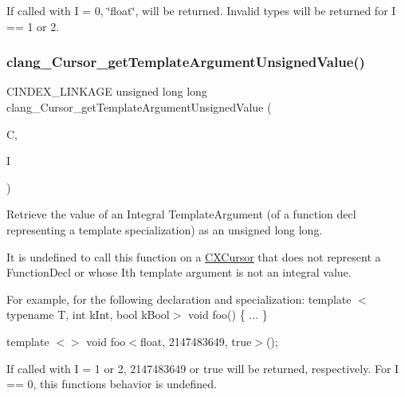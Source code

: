 If called with I = 0, \char`\"{}float\char`\"{}, will be returned. Invalid types will be returned for I == 1 or 2. \mbox{\label{group__CINDEX__TYPES_ga08dac49044448c022457224e73223eb2}} 
\subsubsection{\texorpdfstring{clang\+\_\+\+Cursor\+\_\+get\+Template\+Argument\+Unsigned\+Value()}{clang\_Cursor\_getTemplateArgumentUnsignedValue()}}
{\footnotesize\ttfamily C\+I\+N\+D\+E\+X\+\_\+\+L\+I\+N\+K\+A\+GE unsigned long long clang\+\_\+\+Cursor\+\_\+get\+Template\+Argument\+Unsigned\+Value (\begin{DoxyParamCaption}\item[{\mbox{\hyperlink{structCXCursor}{C\+X\+Cursor}}}]{C,  }\item[{unsigned}]{I }\end{DoxyParamCaption})}



Retrieve the value of an Integral Template\+Argument (of a function decl representing a template specialization) as an unsigned long long. 

It is undefined to call this function on a \mbox{\hyperlink{structCXCursor}{C\+X\+Cursor}} that does not represent a Function\+Decl or whose I\textquotesingle{}th template argument is not an integral value.

For example, for the following declaration and specialization\+: template $<$typename T, int k\+Int, bool k\+Bool$>$ void foo() \{ ... \}

template $<$$>$ void foo$<$float, 2147483649, true$>$();

If called with I = 1 or 2, 2147483649 or true will be returned, respectively. For I == 0, this function\textquotesingle{}s behavior is undefined. \mbox{\label{group__CINDEX__TYPES_ga46e363545effaa0794a2ba4bcfae1fe3}} 
